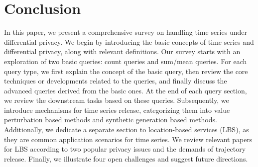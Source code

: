 \section{Conclusion}
In this paper, we present a comprehensive survey on handling time series under differential privacy. We begin by introducing the basic concepts of time series and differential privacy, along with relevant definitions. Our survey starts with an exploration of two basic queries: count queries and sum/mean queries. 
For each query type, we first explain the concept of the basic query, then review the core techniques or developments related to the queries, and finally discuss the advanced queries derived from the basic ones. At the end of each query section, we review the downstream tasks based on these queries. 
Subsequently, we introduce mechanisms for time series release,  categorizing them into value perturbation based methods and synthetic generation based methods.
Additionally, we dedicate a separate section to location-based services (LBS), as they are common application scenarios for time series. We review relevant papers for LBS according to two popular privacy issues and the demands of trajectory release. Finally, we illustrate four open challenges and suggest future directions.





